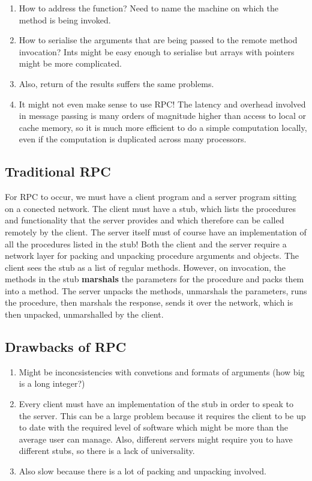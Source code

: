 \documentclass[11pt]{article}
\begin{document}
\begin{enumerate}
  \item How to address the function? Need to name the machine on which the method is being invoked.
  \item How to serialise the arguments that are being passed to the remote method invocation? Ints might be easy enough to serialise but arrays with pointers might be more complicated.
  \item Also, return of the results suffers the same problems.
  \item It might not even make sense to use RPC! The latency and overhead involved in message passing is many orders of magnitude higher than access to local or cache memory, so it is much more efficient to do a simple computation locally, even if the computation is duplicated across many processors.
\end{enumerate}

\subsection{Traditional RPC}

For RPC to occur, we must have a client program and a server program sitting on a conected network. The client must have a stub, which lists the procedures and functionality that the server provides and which therefore can be called remotely by the client. The server itself must of course have an implementation of all the procedures listed in the stub! Both the client and the server require a network layer for packing and unpacking procedure arguments and objects. The client sees the stub as a list of regular methods. However, on invocation, the methods in the stub \textbf{marshals} the parameters for the procedure and packs them into a method. The server unpacks the methods, unmarshals the parameters, runs the procedure, then marshals the response, sends it over the network, which is then unpacked, unmarshalled by the client.


\subsection{Drawbacks of RPC}
\begin{enumerate}
  \item Might be inconcsistencies with convetions and formats of arguments (how big is a long integer?)
  \item Every client must have an implementation of the stub in order to speak to the server. This can be a large problem because it requires the client to be up to date with the required level of software which might be more than the average user can manage. Also, different servers might require you to have different stubs, so there is a lack of universality. 
  \item Also slow because there is a lot of packing and unpacking involved.
\end{enumerate}
\end{document}
